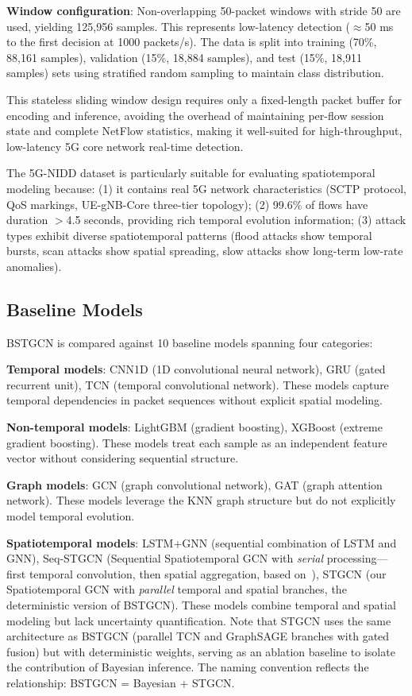 \documentclass[lettersize,journal]{IEEEtran}
\begin{document}
\textbf{Window configuration}: Non-overlapping 50-packet windows with stride 50 are used, yielding 125,956 samples. This represents low-latency detection ($\approx$50 ms to the first decision at 1000 packets/s). The data is split into training (70\%, 88,161 samples), validation (15\%, 18,884 samples), and test (15\%, 18,911 samples) sets using stratified random sampling to maintain class distribution.

This stateless sliding window design requires only a fixed-length packet buffer for encoding and inference, avoiding the overhead of maintaining per-flow session state and complete NetFlow statistics, making it well-suited for high-throughput, low-latency 5G core network real-time detection.

The 5G-NIDD dataset is particularly suitable for evaluating spatiotemporal modeling because: (1) it contains real 5G network characteristics (SCTP protocol, QoS markings, UE-gNB-Core three-tier topology); (2) 99.6\% of flows have duration $>$4.5 seconds, providing rich temporal evolution information; (3) attack types exhibit diverse spatiotemporal patterns (flood attacks show temporal bursts, scan attacks show spatial spreading, slow attacks show long-term low-rate anomalies).

\subsection{Baseline Models}

BSTGCN is compared against 10 baseline models spanning four categories:

\textbf{Temporal models}: CNN1D (1D convolutional neural network), GRU (gated recurrent unit), TCN (temporal convolutional network). These models capture temporal dependencies in packet sequences without explicit spatial modeling.

\textbf{Non-temporal models}: LightGBM (gradient boosting), XGBoost (extreme gradient boosting). These models treat each sample as an independent feature vector without considering sequential structure.

\textbf{Graph models}: GCN (graph convolutional network), GAT (graph attention network). These models leverage the KNN graph structure but do not explicitly model temporal evolution.

\textbf{Spatiotemporal models}: LSTM+GNN (sequential combination of LSTM and GNN), Seq-STGCN (Sequential Spatiotemporal GCN with \textit{serial} processing---first temporal convolution, then spatial aggregation, based on~\cite{Yu2018STGCN}), STGCN (our Spatiotemporal GCN with \textit{parallel} temporal and spatial branches, the deterministic version of BSTGCN). These models combine temporal and spatial modeling but lack uncertainty quantification. Note that STGCN uses the same architecture as BSTGCN (parallel TCN and GraphSAGE branches with gated fusion) but with deterministic weights, serving as an ablation baseline to isolate the contribution of Bayesian inference. The naming convention reflects the relationship: BSTGCN = Bayesian + STGCN.
\end{document}
